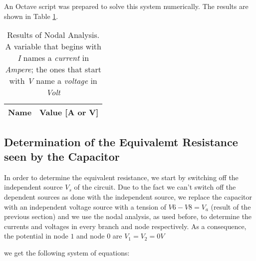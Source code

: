 \hfill


An Octave script was prepared to solve this system numerically. The results are shown in Table \ref{tab:op_tabNodal}.


\begin{table}[b]
  \centering
  \begin{tabular}{|l|r|}
    \hline
    {\bf Name} & {\bf Value [A or V]} \\ \hline
    
  \end{tabular}
  \caption{Results of Nodal Analysis. A variable that begins  with \textit{I} names a \textit{current} in \textit{Ampere}; the ones that start with \textit{V} name a \textit{voltage} in \textit{Volt} }
  \label{tab:op_tabNodal}
\end{table}



\subsection{Determination of the Equivalemt Resistance seen by the Capacitor}

In order to determine the equivalent resistance, we start by switching off the independent source $V_s$ of the circuit. Due to the fact we can't switch off the dependent sources
as done with the independent source, we replace the capacitor with an independent voltage source with a tension of $V6-V8 = V_a$ (result of the previous section) and we use the nodal analysis, as used before,
to determine the currents and voltages in every branch and node respectively. As a consequence, the potential in node $1$ and node $0$ are $V_1 = V_2 = 0 V$

we get the following system of equations:


